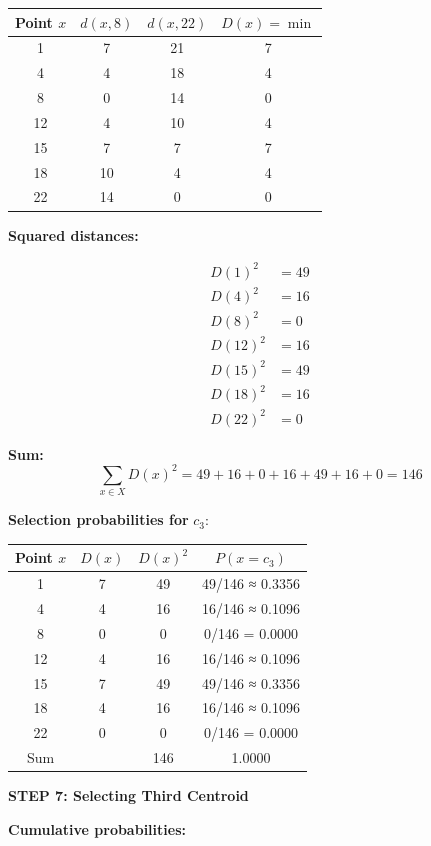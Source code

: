 \documentclass[12pt]{article}
\begin{document}
\begin{solution}
\begin{center}
\begin{tabular}{c|c|c|c}
Point $x$ & $d(x, 8)$ & $d(x, 22)$ & $D(x) = \min$ \\
\hline
1 & 7 & 21 & 7 \\
4 & 4 & 18 & 4 \\
8 & 0 & 14 & 0 \\
12 & 4 & 10 & 4 \\
15 & 7 & 7 & 7 \\
18 & 10 & 4 & 4 \\
22 & 14 & 0 & 0 \\
\end{tabular}
\end{center}

\textbf{Squared distances:}

\begin{align*}
D(1)^2 &= 49 \\
D(4)^2 &= 16 \\
D(8)^2 &= 0 \\
D(12)^2 &= 16 \\
D(15)^2 &= 49 \\
D(18)^2 &= 16 \\
D(22)^2 &= 0
\end{align*}

\textbf{Sum:}
\[
\sum_{x \in X} D(x)^2 = 49 + 16 + 0 + 16 + 49 + 16 + 0 = 146
\]

\textbf{Selection probabilities for } $c_3$:

\begin{center}
\begin{tabular}{c|c|c|c}
Point $x$ & $D(x)$ & $D(x)^2$ & $P(x = c_3)$ \\
\hline
1 & 7 & 49 & 49/146 ≈ 0.3356 \\
4 & 4 & 16 & 16/146 ≈ 0.1096 \\
8 & 0 & 0 & 0/146 = 0.0000 \\
12 & 4 & 16 & 16/146 ≈ 0.1096 \\
15 & 7 & 49 & 49/146 ≈ 0.3356 \\
18 & 4 & 16 & 16/146 ≈ 0.1096 \\
22 & 0 & 0 & 0/146 = 0.0000 \\
\hline
Sum & & 146 & 1.0000 \\
\end{tabular}
\end{center}

\textbf{STEP 7: Selecting Third Centroid}

\textbf{Cumulative probabilities:}


\end{solution}
\end{document}
